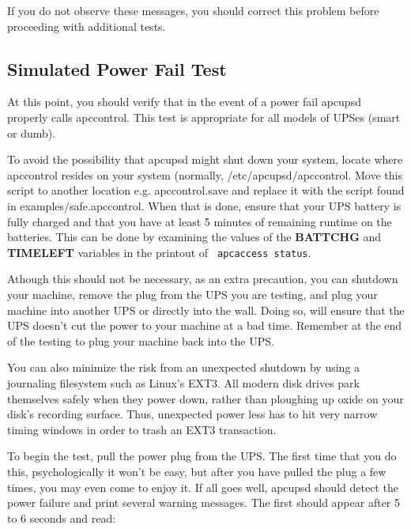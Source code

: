 {{If you do not observe these messages, you should correct this problem before
proceeding with additional tests. 

\label{Simulated-Power-Fail-Test}

\subsection*{Simulated Power Fail Test}

\label{index-Testing_002c-Simulate-Power-Fail-93}
\label{index-Simulate-Power-Fail-Test-94}
At this point, you should verify that in the event of a power fail apcupsd
properly calls apccontrol. This test is appropriate for all models of UPSes
(smart or dumb).  

To avoid the possibility that apcupsd might shut down your system, locate
where apccontrol resides on your system (normally, /etc/apcupsd/apccontrol.
Move this script to another location e.g. apccontrol.save and replace it with
the script found in examples/safe.apccontrol. When that is done, ensure that
your UPS battery is fully charged and that you have at least 5 minutes of
remaining runtime on the batteries. This can be done by examining the values
of the {\bf BATTCHG} and {\bf TIMELEFT} variables in the printout of {\tt
apcaccess status}.  

Athough this should not be necessary, as an extra precaution, you can shutdown
your machine, remove the plug from the UPS you are testing, and plug your
machine into another UPS or directly into the wall. Doing so, will ensure that
the UPS doesn't cut the power to your machine at a bad time. Remember at the
end of the testing to plug your machine back into the UPS.  

You can also minimize the risk from an unexpected shutdown by using a
journaling filesystem such as Linux's EXT3.  All modern disk drives park
themselves safely when they power down, rather than ploughing up oxide on your
disk's recording surface.  Thus, unexpected power less has to hit very narrow
timing windows in order to trash an EXT3 transaction.  

To begin the test, pull the power plug from the UPS. The first time that you
do this, psychologically it won't be easy, but after you have pulled the plug
a few times, you may even come to enjoy it. If all goes well, apcupsd should
detect the power failure and print several warning messages. The first should
appear after 5 to 6 seconds and read: 

}}
